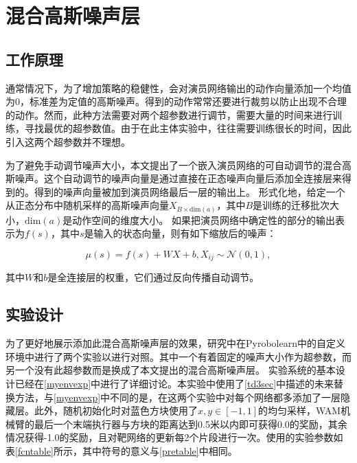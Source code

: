 \chapter{混合高斯噪声层}

\section{工作原理}
通常情况下，为了增加策略的稳健性，会对演员网络输出的动作向量添加一个均值为0，标准差为定值的高斯噪声。得到的动作常常还要进行裁剪以防止出现不合理的动作。然而，此种方法需要对两个超参数进行调节，需要大量的时间来进行训练，寻找最优的超参数值。由于在此主体实验中，往往需要训练很长的时间，因此引入这两个超参数并不理想。
    
为了避免手动调节噪声大小，本文提出了一个嵌入演员网络的可自动调节的混合高斯噪声。这个自动调节的噪声向量是通过直接在正态噪声向量后添加全连接层来得到的。得到的噪声向量被加到演员网络最后一层的输出上。
形式化地，给定一个从正态分布中随机采样的高斯噪声向量$X_{B\times \mathrm{dim}(a)}$，其中$B$是训练的迁移批次大小，$\mathrm{dim}(a)$是动作空间的维度大小。
如果把演员网络中确定性的部分的输出表示为$f(s)$，其中$s$是输入的状态向量，则有如下缩放后的噪声：

    $$ \mu(s) = f(s) + W X + b, X_{ij}\sim\mathcal N(0,1),$$

    其中$W$和$b$是全连接层的权重，它们通过反向传播自动调节。

\section{实验设计}
    为了更好地展示添加此混合高斯噪声层的效果，研究中在Pyrobolearn中的自定义环境中进行了两个实验以进行对照。其中一个有着固定的噪声大小作为超参数，而另一个没有此超参数而是换成了本文提出的混合高斯噪声层。
    实验系统的基本设计已经在\ref{myenvexp}中进行了详细讨论。本实验中使用了\ref{td3sec}中描述的未来替换方法，与\ref{myenvexp}中不同的是，在这两个实验中对每个网络都多添加了一层隐藏层。此外，随机初始化时对蓝色方块使用了$x,y\in[-1,1]$的均匀采样，WAM机械臂的最后一个末端执行器与方块的距离达到0.5米以内即可获得0.0的奖励，其余情况获得-1.0的奖励，且对靶网络的更新每2个片段进行一次。使用的实验参数如表\ref{fcntable}所示，其中符号的意义与\ref{pretable}中相同。

